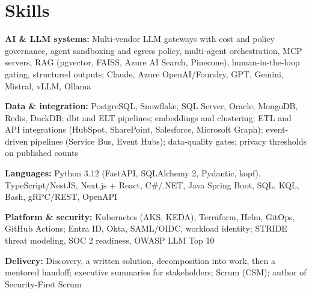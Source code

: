 \documentclass[10pt,letterpaper]{article}
\newcommand{\szmeta}{\fontsize{8pt}{10pt}\selectfont}
\begin{document}
\section*{Skills}
{\szmeta \textbf{AI \& LLM systems:} Multi-vendor LLM gateways with cost and policy governance, agent sandboxing and egress policy, multi-agent orchestration, MCP servers, RAG (pgvector, FAISS, Azure AI Search, Pinecone), human-in-the-loop gating, structured outputs; Claude, Azure OpenAI/Foundry, GPT, Gemini, Mistral, vLLM, Ollama\par\vspace{2pt}\textbf{Data \& integration:} PostgreSQL, Snowflake, SQL Server, Oracle, MongoDB, Redis, DuckDB; dbt and ELT pipelines; embeddings and clustering; ETL and API integrations (HubSpot, SharePoint, Salesforce, Microsoft Graph); event-driven pipelines (Service Bus, Event Hubs); data-quality gates; privacy thresholds on published counts\par\vspace{2pt}\textbf{Languages:} Python 3.12 (FastAPI, SQLAlchemy 2, Pydantic, kopf), TypeScript/NestJS, Next.js + React, C\#/.NET, Java Spring Boot, SQL, KQL, Bash, gRPC/REST, OpenAPI\par\vspace{2pt}\textbf{Platform \& security:} Kubernetes (AKS, KEDA), Terraform, Helm, GitOps, GitHub Actions; Entra ID, Okta, SAML/OIDC, workload identity; STRIDE threat modeling, SOC 2 readiness, OWASP LLM Top 10\par\vspace{2pt}\textbf{Delivery:} Discovery, a written solution, decomposition into work, then a mentored handoff; executive summaries for stakeholders; Scrum (CSM); author of Security-First Scrum}\par
\end{document}
